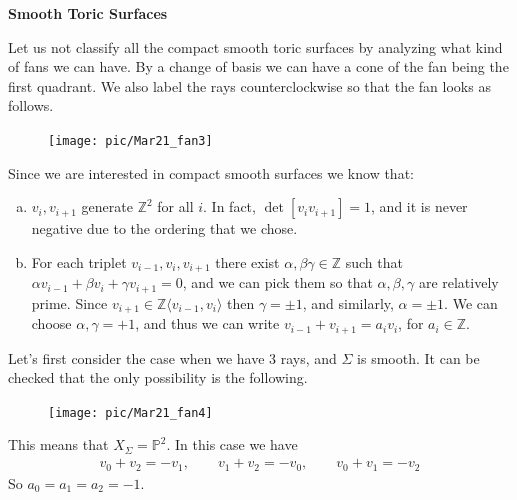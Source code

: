 \documentclass[a4paper,12pt]{amsart}
\newcommand{\ZZ}{\mathbb{Z}}
\newcommand{\PP}{\mathbb{P}}
\begin{document}
\noindent\textbf{Smooth Toric Surfaces}

Let us not classify all the compact smooth toric surfaces by analyzing what kind of fans we can have. By a change of basis we can have a cone of the fan being the first quadrant. We also label the rays counterclockwise so that the fan looks as follows.

\begin{figure}[h]
	\centering
	\texttt{[image: pic/Mar21\_fan3]}
\end{figure}

Since we are interested in compact smooth surfaces we know that:
\begin{enumerate}[(a)]
	\item $v_i,v_{i+1}$ generate $\ZZ^2$ for all $i$. In fact, $\det[v_i v_{i+1}]=1$, and it is never negative due to the ordering that we chose.
	\item For each triplet $v_{i-1},v_i,v_{i+1}$ there exist $\alpha,\beta\gamma\in\ZZ$ such that $\alpha v_{i-1}+\beta v_i+\gamma v_{i+1}=0$, and we can pick them so that $\alpha,\beta,\gamma$ are relatively prime. Since $v_{i+1}\in\ZZ\langle v_{i-1},v_i\rangle$ then $\gamma=\pm 1$, and similarly, $\alpha=\pm 1$. We can choose $\alpha,\gamma=+1$, and thus we can write $v_{i-1}+v_{i+1}=a_i v_i$, for $a_i\in\ZZ$.
\end{enumerate}

\begin{example}
	Let's first consider the case when we have 3 rays, and $\Sigma$ is smooth. It can be checked that the only possibility is the following.
	\vspace{5cm}
	\begin{figure}[h]
		\centering
		\texttt{[image: pic/Mar21\_fan4]}
	\end{figure}
	
	This means that $X_\Sigma=\PP^2$. In this case we have
	\begin{align*}
	v_0+v_2=-v_1,\qquad v_1+v_2=-v_0,\qquad v_0+v_1=-v_2
	\end{align*}
	So $a_0=a_1=a_2=-1$.
\end{example}
\end{document}
